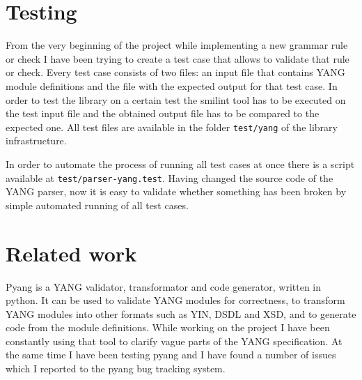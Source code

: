 \documentclass[conference]{IEEEtran}
\begin{document}
\section{Testing}
From the very beginning of the project  while implementing a new grammar rule or check I have been trying to create a test case that allows to validate that rule or check. 
Every test case consists of two files: an input file that contains YANG module definitions and the file with the expected output for that test case. 
In order to test the library on a certain test the smilint tool has to be executed on the test input file and the obtained output file has to be compared to the expected one. 
All test files are available in the folder 	\texttt{test/yang} of the library infrastructure.

In order to automate the process of running all test cases at once there is a script available at \texttt{test/parser-yang.test}. 
Having changed the source code of the YANG parser, now it is easy to validate whether something has been broken by simple automated running of all test cases.

\section{Related work}
Pyang \cite{bib8} is a YANG validator, transformator and code generator, written in python.
It can be used to validate YANG modules for correctness, to transform YANG modules into other formats such as YIN, DSDL and XSD, 
and to generate code from the module definitions. 
While working on the project I have been constantly using that tool to clarify vague parts of the YANG specification.
At the same time I have been testing pyang and I have found a number of issues which I reported to the pyang bug tracking system.
\end{document}
